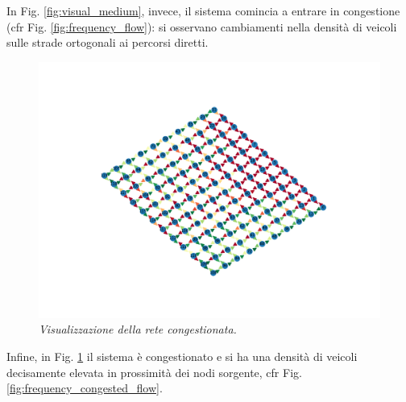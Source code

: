 \documentclass[../main.tex]{subfiles}
\begin{document}
In Fig. \ref{fig:visual_medium}, invece, il sistema comincia a entrare in congestione (cfr Fig. \ref{fig:frequency_flow}): si osservano cambiamenti nella densit\`a di veicoli sulle strade ortogonali ai percorsi diretti.
\begin{figure}
    \includegraphics[scale=0.25, trim={2cm 5cm 10cm 5cm},clip]{./data/img/congested_flow.png}
    \caption[Visualizzazione della rete congestionata.]{\emph{Visualizzazione della rete congestionata.}}
    \label{fig:visual_congested}
\end{figure}
Infine, in Fig. \ref{fig:visual_congested} il sistema \`e congestionato e si ha una densit\`a di veicoli decisamente elevata in prossimit\`a dei nodi sorgente, cfr Fig. \ref{fig:frequency_congested_flow}.
\end{document}
